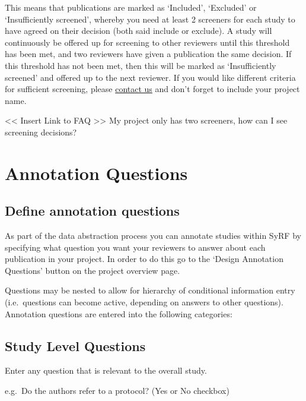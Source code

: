 \documentclass[
]{book}
\begin{document}
This means that publications are marked as `Included', `Excluded' or `Insufficiently screened', whereby you need at least 2 screeners for each study to have agreed on their decision (both said include or exclude). A study will continuously be offered up for screening to other reviewers until this threshold has been met, and two reviewers have given a publication the same decision. If this threshold has not been met, then this will be marked as `Insufficiently screened' and offered up to the next reviewer.
If you would like different criteria for sufficient screening, please \href{mailtp:syrf.info@ed.ac.uk?subject=Screening\%20Criteria\%20in\%20SyRF}{contact us} and don't forget to include your project name.

\textless{}\textless{} Insert Link to FAQ \textgreater{}\textgreater{}
My project only has two screeners, how can I see screening decisions?

\hypertarget{annotation}{%
\chapter{Annotation Questions}\label{annotation}}

\hypertarget{define-annotation-questions}{%
\section{Define annotation questions}\label{define-annotation-questions}}

As part of the data abstraction process you can annotate studies within SyRF by specifying what question you want your reviewers to answer about each publication in your project.
In order to do this go to the `Design Annotation Questions' button on the project overview page.

Questions may be nested to allow for hierarchy of conditional information entry (i.e.~questions can become active, depending on answers to other questions).
Annotation questions are entered into the following categories:

\hypertarget{study-level-questions}{%
\section{Study Level Questions}\label{study-level-questions}}

Enter any question that is relevant to the overall study.

e.g.~Do the authors refer to a protocol?
(Yes or No checkbox)
\end{document}
